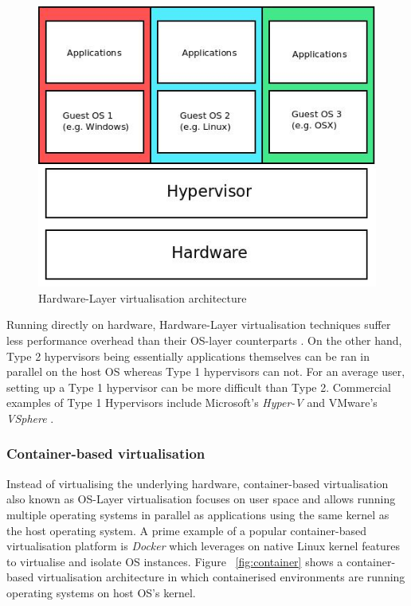 \begin{figure}[ht!]
\centering
  \includegraphics[width=\textwidth, keepaspectratio]{hwlayer.jpeg}%
  \caption{Hardware-Layer virtualisation architecture}
  \label{fig:hardware}
\end{figure}

Running directly on hardware, Hardware-Layer virtualisation techniques suffer less performance overhead than their OS-layer counterparts \cite{taxonomy}. On the other hand, Type 2 hypervisors being essentially applications themselves can be ran in parallel on the host OS whereas Type 1 hypervisors can not. For an average user, setting up a Type 1 hypervisor can be more difficult than Type 2. Commercial examples of Type 1 Hypervisors include Microsoft's \textit{Hyper-V}\cite{hyperv} and VMware's \textit{VSphere} \cite{vsphere}.

\subsubsection{Container-based virtualisation}

Instead of virtualising the underlying hardware, container-based virtualisation also known as OS-Layer virtualisation \cite{taxonomy} focuses on user space and allows running multiple operating systems in parallel as applications using the same kernel as the host operating system. A prime example of a popular container-based virtualisation platform is \textit{Docker} \cite{docker} which leverages on native Linux kernel features to virtualise and isolate OS instances. Figure ~\ref{fig:container} shows a container-based virtualisation architecture in which containerised environments are running operating systems on host OS's kernel. 

